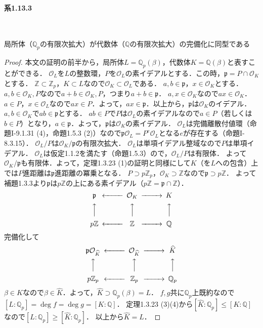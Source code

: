 \paragraph{系1.13.3}~
\begin{screen}
  局所体（$\mathbb{Q}_p$の有限次拡大）が代数体（$\mathbb{Q}$の有限次拡大）の完備化に同型である
\end{screen}
\begin{proof}
  本文の証明の前半から，局所体$L=\mathbb{Q}_p(\beta)$，代数体$K=\mathbb{Q}(\beta)$と表すことができる．
  $\mathcal{O}_L$を$L$の整数環，$P$を$\mathcal{O}_L$の素イデアルとする．この時，$\mathfrak{p}=P\cap\mathcal{O}_K$とする．
  $\mathbb{Z} \subset \mathbb{Z}_p$，$K \subset L$なので$\mathcal{O}_K \subset \mathcal{O}_L$である．
  $a,b\in\mathfrak{p}$，$x\in\mathcal{O}_K$とする．
  $a,b\in\mathcal{O}_K,P$なので$a+b\in\mathcal{O}_K,P$，つまり$a+b\in\mathfrak{p}$．
  $a,x\in\mathcal{O}_K$なので$ax\in\mathcal{O}_K$．
  $a\in P$，$x\in\mathcal{O}_L$なので$ax\in P$．よって，$ax\in\mathfrak{p}$．以上から，$\mathfrak{p}$は$\mathcal{O}_K$のイデアル．
  $a,b\in\mathcal{O}_K$で$ab\in \mathfrak{p}$とする．
  $ab\in P$で$P$は$\mathcal{O}_L$の素イデアルなので$a\in P$（若しくは$b\in P$）となり，$a\in\mathfrak{p}$．よって，$\mathfrak{p}$は$\mathcal{O}_K$の素イデアル．
  $\mathcal{O}_L$は完備離散付値環（命題I-9.1.31 (4)，命題1.5.3 (2)）なので$\mathfrak{p}\mathcal{O}_L=P^e\mathcal{O}_L$となる$e$が存在する（命題I-8.3.15）．
  $\mathcal{O}_L/P$は$\mathcal{O}_K/\mathfrak{p}$の有限次拡大．
  $\mathcal{O}_L$は単項イデアル整域なので$P$は単項イデアル．
  $\mathcal{O}_L$は仮定1.1.2を満たす（命題1.5.3）ので，$\mathcal{O}_L/P$は有限体．
  よって$\mathcal{O}_K/\mathfrak{p}$も有限体．よって，定理1.3.23 (1)の証明と同様にして$K$（を$L$への包含）上では$P$進距離は$\mathfrak{p}$進距離の冪乗となる．
  $P\supset p\mathbb{Z}_p$，$\mathcal{O}_K\supset\mathbb{Z}$なので$\mathfrak{p}\supset p\mathbb{Z}$．
  よって補題1.3.3より$\mathfrak{p}$は$p\mathbb{Z}$の上にある素イデアル（$p\mathbb{Z}=\mathfrak{p}\cap\mathbb{Z}$）．
  \[
  \begin{CD}
    \mathfrak{p} @<<< \mathcal{O}_K @>>> K \\
    @AAA         @AAA               @AAA \\
    p\mathbb{Z}  @<<< \mathbb{Z}    @>>> \mathbb{Q}
  \end{CD}
  \]
  完備化して
  \[
  \begin{CD}
    \mathfrak{p}\mathcal{O}_{\widehat{K}}   @<<< \mathcal{O}_{\widehat{K}} @>>> \widehat{K}\\
    @AAA                              @AAA                     @AAA \\
    p\mathbb{Z}_p                     @<<< \mathbb{Z}_p        @>>> \mathbb{Q}_p
  \end{CD}
  \]
  $\beta\in K$なので$\beta\in\widehat{K}$．よって，$\widehat{K}\supset\mathbb{Q}_p(\beta)=L$．
  $f,g$共に$\mathbb{Q}_p$上既約なので$[L:\mathbb{Q}_p]=\deg f=\deg g=[K:\mathbb{Q}]$．
  定理1.3.23 (3)(4)から$[\widehat{K}:\mathbb{Q}_p]\leq[K:\mathbb{Q}]$なので$[L:\mathbb{Q}_p]\geq[\widehat{K}:\mathbb{Q}_p]$．
  以上から$\widehat{K}=L$．
\end{proof}

